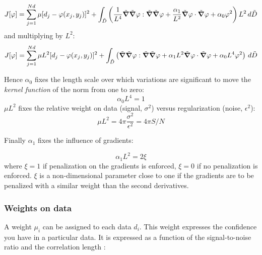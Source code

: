 \begin{equation}
J[\varphi]=\sum_{j=1}^{Nd}\mu[d_{j}-\varphi(x_{j},y_{j})]^{2}+
 \int_{\tilde{D}}\left(
\frac{1}{L^4} \tilde{\boldsymbol{\nabla}}\tilde{\boldsymbol{\nabla}}\varphi : \tilde{\boldsymbol{\nabla}}\tilde{\boldsymbol{\nabla}}\varphi + \frac{\alpha_{1}}{L^2}
\tilde{\boldsymbol{\nabla}}\varphi \cdot \tilde{\boldsymbol{\nabla}}\varphi + \alpha_{0} \varphi^{2} \right) L^2\,d\tilde{D}
\end{equation}
and multiplying by $L^{2}$:
\begin{equation}
{J}[\varphi]=\sum_{j=1}^{Nd}\mu L^2 [d_{j}-\varphi(x_{j},y_{j})]^{2}+
 \int_{\tilde{D}}\left(
 \tilde{\boldsymbol{\nabla}}\tilde{\boldsymbol{\nabla}}\varphi : \tilde{\boldsymbol{\nabla}}\tilde{\boldsymbol{\nabla}}\varphi + { \alpha_{1} L^2}
\tilde{\boldsymbol{\nabla}}\varphi \cdot \tilde{\boldsymbol{\nabla}}\varphi + \alpha_{0} L^4 \varphi^{2} \right) \,d\tilde{D}
\label{divaformulaadim}
\end{equation}


Hence $\alpha_0$ fixes the length scale over which variations are significant to move the \textit{kernel function} of the norm from one to zero:
\begin{equation}
\alpha_0 L^4 = 1
\end{equation}
$ \mu L^2$ fixes the relative weight on data (signal, $\sigma^2$) versus regularization (noise, $\epsilon^2$):
\begin{equation}
\mu L^2= 4 \pi \frac{\sigma^2}{\epsilon^2}= 4 \pi S/N 
\label{defmu}
\end{equation}

Finally  $\alpha_1$ fixes the influence of gradients:

\begin{equation}
\alpha_1 L^2 = 2 \xi
\end{equation}
where $\xi=1$ if penalization on the gradients is enforced, $\xi=0$ if no penalization is enforced. $\xi$ is a non-dimensional parameter close to one if the gradients are to be penalized with a similar weight than the second derivatives.


\subsubsection{Weights on data}

A weight $\mu_i$  can be assigned to each data $d_i$. This weight expresses the confidence you have in a particular data. It is expressed as a function of the signal-to-noise ratio and the correlation length \citep{BRANKART96}: 

